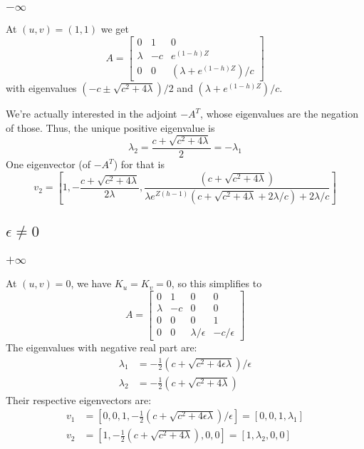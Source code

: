 \documentclass[10pt]{article}
\begin{document}
\subsubsection{$-\infty$}
At $(u,v) = (1,1)$ we get
\[
A = \begin{bmatrix}
0 & 1 & 0 \\
\lambda &  -c  &  e^{(1-h)Z} \\
0 &  0  &  (\lambda + e^{(1-h)Z})/c
\end{bmatrix}
\]
with eigenvalues $(-c \pm \sqrt{c^2 + 4 \lambda})/2$ and $(\lambda + e^{(1-h)Z})/c$.

We're actually interested in the adjoint $-A^T$, whose eigenvalues are the negation of those.
Thus, the unique positive eigenvalue is
\[\lambda_2 = \frac{c + \sqrt{c^2 + 4 \lambda}}{2} = -\lambda_1 \]
One eigenvector (of $-A^T$) for that is
\[
v_2 = \left[1, -\frac{c + \sqrt{c^2 + 4 \lambda}}{2\lambda}, \frac{(c + \sqrt{c^2+4\lambda})}{\lambda e^{Z(h-1)}(c + \sqrt{c^2+4\lambda} + 2 \lambda/c)+ 2 \lambda / c}\right]
\]

\subsection{$\epsilon \neq 0$}
\subsubsection{$+\infty$}
At $(u,v) = 0$, we have $K_u = K_v = 0$, so this simplifies to
\[
A = \begin{bmatrix}
0 & 1 & 0 & 0 \\
\lambda &  -c  &  0  & 0 \\
0 & 0 & 0 & 1 \\
0 &  0  &  \lambda /\epsilon  &  - c / \epsilon
\end{bmatrix}
\]
The eigenvalues with negative real part are:
\begin{align*}
    \lambda_1 &= -\frac{1}{2} (c + \sqrt{c^2 + 4 \epsilon \lambda})/\epsilon\\
    \lambda_2 &= -\frac{1}{2} (c + \sqrt{c^2 + 4 \lambda})
\end{align*}
Their respective eigenvectors are:
\begin{align*}
    v_1 &= [0,0,1,-\frac{1}{2} (c + \sqrt{c^2 + 4 \epsilon \lambda})/\epsilon] = [0,0,1,\lambda_1] \\
    v_2 &= [1, -\frac{1}{2} (c + \sqrt{c^2 + 4 \lambda}), 0, 0] = [1,\lambda_2,0,0]
\end{align*}
\end{document}
